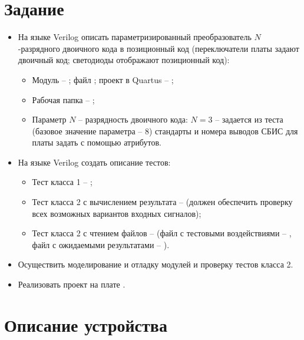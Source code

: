 





\tableofcontents
\lstlistoflistings
\listoffigures
\newpage

\section{Задание}

\begin{itemize}
	\item На языке Verilog описать параметризированный преобразователь $N$-разрядного двоичного кода в позиционный код (переключатели платы  задают двоичный код; светодиоды отображают позиционный код):
		\begin{itemize}
			\item Модуль -- ; файл ; проект в Quartus -- ; \item Рабочая папка -- ;
			\item Параметр $N$ -- разрядность двоичного кода: $N=3$ -- задается из теста (базовое значение параметра -- $8$) стандарты и номера выводов СБИС для платы  задать с помощью атрибутов.
		\end{itemize}
	
	\item На языке Verilog создать описание тестов:
		\begin{itemize}
			\item Тест класса 1 -- ;
			\item Тест класса 2 с вычислением результата --  (должен обеспечить проверку всех возможных вариантов входных сигналов);
			\item Тест класса 2 с чтением файлов --  (файл с тестовыми воздействиями -- , файл с ожидаемыми результатами -- ).
		\end{itemize}
	\item Осуществить моделирование и отладку модулей и проверку тестов класса 2.
	\item Реализовать проект на плате .
\end{itemize}

\section{Описание устройства}

